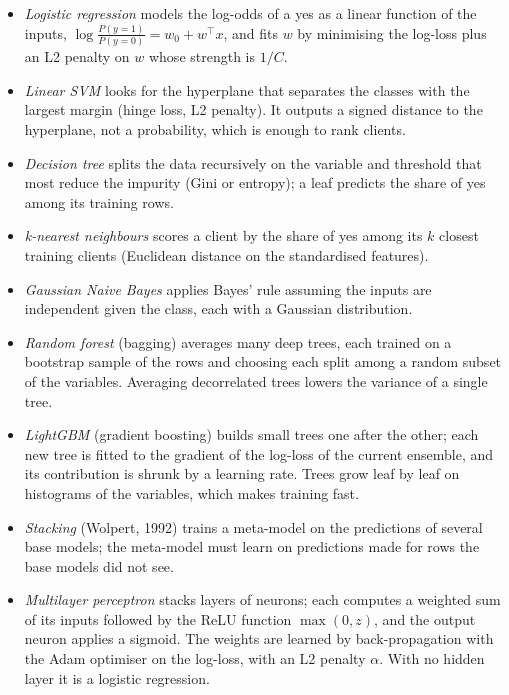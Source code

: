 \documentclass[11pt,a4paper]{article}
\begin{document}
\begin{itemize}
\item \emph{Logistic regression} models the log-odds of a yes as a linear function of the inputs,
$\log\frac{P(y=1)}{P(y=0)} = w_0 + w^\top x$, and fits $w$ by minimising the log-loss plus an L2 penalty on $w$ whose
strength is $1/C$.
\item \emph{Linear SVM} looks for the hyperplane that separates the classes with the largest margin (hinge loss,
L2 penalty). It outputs a signed distance to the hyperplane, not a probability, which is enough to rank clients.
\item \emph{Decision tree} splits the data recursively on the variable and threshold that most reduce the impurity
(Gini or entropy); a leaf predicts the share of yes among its training rows.
\item \emph{k-nearest neighbours} scores a client by the share of yes among its $k$ closest training clients
(Euclidean distance on the standardised features).
\item \emph{Gaussian Naive Bayes} applies Bayes' rule assuming the inputs are independent given the class, each
with a Gaussian distribution.
\item \emph{Random forest} (bagging) averages many deep trees, each trained on a bootstrap sample of the rows and
choosing each split among a random subset of the variables. Averaging decorrelated trees lowers the variance of a
single tree.
\item \emph{LightGBM} (gradient boosting) builds small trees one after the other; each new tree is fitted to the
gradient of the log-loss of the current ensemble, and its contribution is shrunk by a learning rate. Trees grow
leaf by leaf on histograms of the variables, which makes training fast.
\item \emph{Stacking} (Wolpert, 1992) trains a meta-model on the predictions of several base models; the meta-model
must learn on predictions made for rows the base models did not see.
\item \emph{Multilayer perceptron} stacks layers of neurons; each computes a weighted sum of its inputs followed by
the ReLU function $\max(0,z)$, and the output neuron applies a sigmoid. The weights are learned by back-propagation
with the Adam optimiser on the log-loss, with an L2 penalty $\alpha$. With no hidden layer it is a logistic
regression.
\end{itemize}

\end{document}
